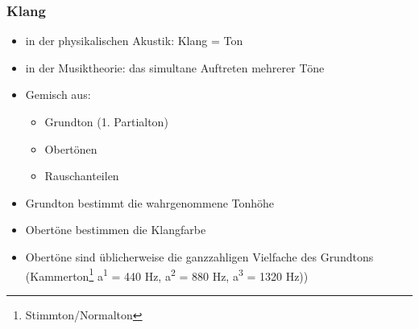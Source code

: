 \documentclass[11pt,ngerman]{beamer}
\begin{document}
\begin{frame}
\frametitle{Klang}

\begin{itemize}
\item in der physikalischen Akustik: Klang = Ton
\item in der Musiktheorie: das simultane Auftreten mehrerer Töne
\item Gemisch aus:

\begin{itemize}
	\item Grundton (1. Partialton)
	\item Obertönen
	\item Rauschanteilen
	\end{itemize}

\item Grundton bestimmt die wahrgenommene Tonhöhe
\item Obertöne bestimmen die Klangfarbe
\item Obertöne sind üblicherweise die ganzzahligen Vielfache des Grundtons (Kammerton\footnote{Stimmton/Normalton} a\textsuperscript{1} = 440 Hz, a\textsuperscript{2} = 880 Hz, \newline a\textsuperscript{3} = 1320 Hz))
\end{itemize}
\end{frame}

\end{document}
